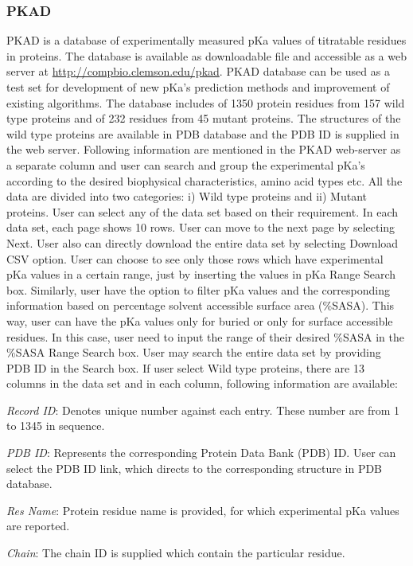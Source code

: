 \documentclass[9pt,tutorial]{livecoms}
\begin{document}
\subsubsection{PKAD}
PKAD is a database of experimentally measured pKa values of titratable residues in proteins. The database\cite{pahari2019pkad} is available as downloadable file and accessible as a web server at \url{http://compbio.clemson.edu/pkad}. PKAD database can be used as a test set for development of new pKa’s prediction methods and improvement of existing algorithms. The database includes of 1350 protein residues from 157 wild type proteins and of 232 residues from 45 mutant proteins. The structures of the wild type proteins are available in PDB database and the PDB ID is supplied in the web server. Following information are mentioned in the PKAD web-server as a separate column and user can search and group the experimental pKa’s according to the desired biophysical characteristics, amino acid types etc. All the data are divided into two categories: i) Wild type proteins and ii) Mutant proteins. User can select any of the data set based on their requirement. In each data set, each page shows 10 rows. User can move to the next page by selecting Next. User also can directly download the entire data set by selecting Download CSV option. User can choose to see only those rows which have experimental pKa values in a certain range, just by inserting the values in pKa Range Search box. Similarly, user have the option to filter pKa values and the corresponding information based on percentage solvent accessible surface area (\%SASA). This way, user can have the pKa values only for buried or only for surface accessible residues. In this case, user need to input the range of their desired \%SASA in the \%SASA Range Search box. User may search the entire data set by providing PDB ID in the Search box. If user select Wild type proteins, there are 13 columns in the data set and in each column, following information are available:

\textit{Record ID}: Denotes unique number against each entry. These number are from 1 to 1345 in sequence.

\textit{PDB ID}: Represents the corresponding Protein Data Bank (PDB) ID. User can select the PDB ID link, which directs to the corresponding structure in PDB database. 

\textit{Res Name}: Protein residue name is provided, for which experimental pKa values are reported.

\textit{Chain}: The chain ID is supplied which contain the particular residue.
\end{document}
